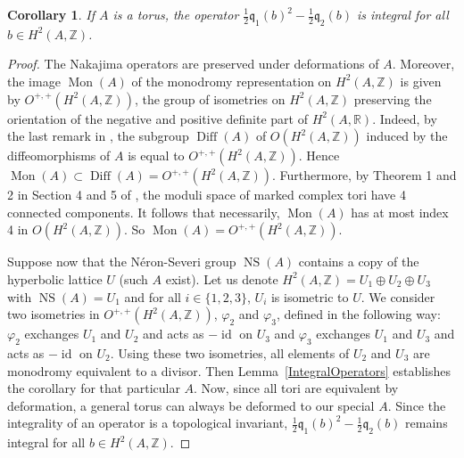 \documentclass{alggeom}
\DeclareMathOperator{\id}{id}
\DeclareMathOperator{\NS}{NS}
\DeclareMathOperator{\Mon}{Mon}
\DeclareMathOperator{\Diff}{Diff}
\newcommand{\q}{\mathfrak{q}}
\newcommand{\R}{\mathbb{R}}
\newcommand{\Z}{\mathbb{Z}}
\theoremstyle{plain}
\newtheorem{corollary}[theorem]{Corollary}
\theoremstyle{definition}
\theoremstyle{remark}
\begin{document}
\begin{corollary} \label{IntegralOperatorsTorus}
If $A$ is a torus, the operator $\frac{1}{2}\q_1(b)^2 - \frac{1}{2}\q_2(b)$ is integral for all $b\in H^2(A,\Z)$. 
\end{corollary}
\begin{proof}
The Nakajima operators are preserved under deformations of $A$. 
Moreover, 
the image $\Mon(A)$ of the monodromy representation on $H^2(A,\Z)$ is given by $O^{+,+}(H^2(A,\Z))$, the group of isometries on $H^2(A,\Z)$ preserving the orientation of the negative and positive definite part of $H^2(A,\R)$.
Indeed, by the last remark in \cite{Borcea}, the subgroup $\Diff(A)$ of $O(H^2(A,\Z))$ induced by the diffeomorphisms of $A$ is equal to  $O^{+,+}(H^2(A,\Z))$. 
Hence $\Mon(A)\subset \Diff(A) = O^{+,+}(H^2(A,\Z))$. Furthermore, by Theorem 1 and 2 in Section 4 and 5 of \cite{Shioda}, the moduli space of marked complex tori have 4 connected components. 
It follows that necessarily, $\Mon(A)$ has at most index 4 in $O(H^2(A,\Z))$. So $\Mon(A)= O^{+,+}(H^2(A,\Z))$.



Suppose now that the N\'eron-Severi group $\NS(A)$ contains a copy of the hyperbolic lattice $U$ (such $A$ exist).
Let us denote $H^2(A,\Z)=U_1\oplus U_2\oplus U_3$ with $\NS(A)=U_1$ and for all $i\in\{1,2,3\}$, $U_i$ is isometric to $U$.
We consider two isometries in $O^{+,+}(H^2(A,\Z))$, $\varphi_2$ and $\varphi_3$, defined in the following way:
$\varphi_2$ exchanges $U_1$ and $U_2$ and acts as $-\id$ on $U_3$ and $\varphi_3$ exchanges $U_1$ and $U_3$ and acts as $-\id$ on $U_2$.
Using these two isometries, all elements of $U_2$ and $U_3$ are monodromy equivalent to a divisor.
Then Lemma~\ref{IntegralOperators} establishes the corollary for that particular $A$. 
Now, since all tori are equivalent by deformation, a general torus can always be deformed to our special $A$. Since the integrality of an operator is a topological invariant, $\frac{1}{2}\q_1(b)^2 - \frac{1}{2}\q_2(b)$ remains integral for all $b\in H^2(A,\Z)$.
\end{proof}
\end{document}
